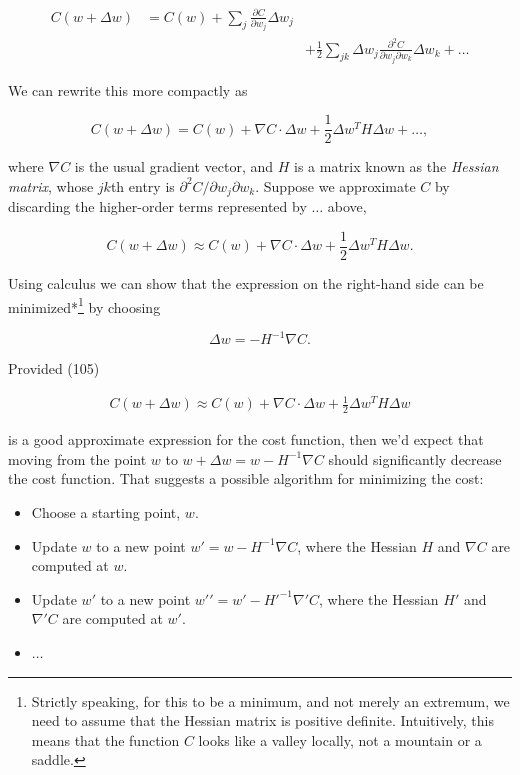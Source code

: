 \begin{align}
C(w+\Delta w) &= C(w) + \sum_j \frac{\partial C}{\partial w_j} \Delta w_j \nonumber \\ & & + \frac{1}{2} \sum_{jk} \Delta w_j \frac{\partial^2 C}{\partial w_j \partial w_k} \Delta w_k + \ldots \tag{103}
\end{align}

\noindent We can rewrite this more compactly as

\begin{equation}
C(w+\Delta w) = C(w) + \nabla C \cdot \Delta w + \frac{1}{2} \Delta w^T H \Delta w + \ldots,
\tag{104}
\end{equation}

\noindent where $\nabla C$ is the usual gradient vector, and $H$ is a matrix known as the \emph{Hessian matrix}, whose $jk$th entry is $\partial^2 C / \partial w_j \partial w_k$. Suppose we approximate $C$ by discarding the higher-order terms represented by $\ldots$ above,

\begin{equation}
C(w+\Delta w) \approx C(w) + \nabla C \cdot \Delta w + \frac{1}{2} \Delta w^T H \Delta w.
\tag{105}
\end{equation}

\noindent Using calculus we can show that the expression on the right-hand side can be minimized*\footnote{Strictly speaking, for this to be a minimum, and not merely an extremum, we need to assume that the Hessian matrix is positive definite. Intuitively, this means that the function $C$ looks like a valley locally, not a mountain or a saddle.} by choosing

\begin{equation}
\Delta w = -H^{-1} \nabla C.
\tag{106}
\end{equation}

\noindent Provided (105)

\begin{align*}
C(w+\Delta w) \approx C(w) + \nabla C \cdot \Delta w + \frac{1}{2} \Delta w^T H \Delta w \nonumber
\end{align*}

\noindent is a good approximate expression for the cost function, then we'd expect that moving from the point $w$ to $w+\Delta w = w-H^{-1} \nabla C$ should significantly decrease the cost function. That suggests a possible algorithm for minimizing the cost:



\begin{itemize}

\item Choose a starting point, $w$.

\item Update $w$ to a new point $w' = w-H^{-1} \nabla C$, where the Hessian $H$ and $\nabla C$ are computed at $w$.

\item Update $w'$ to a new point $w{'}{'} = w'-H'^{-1} \nabla' C$, where the Hessian $H'$ and $\nabla' C$ are computed at $w'$.

\item $\ldots$

\end{itemize}


